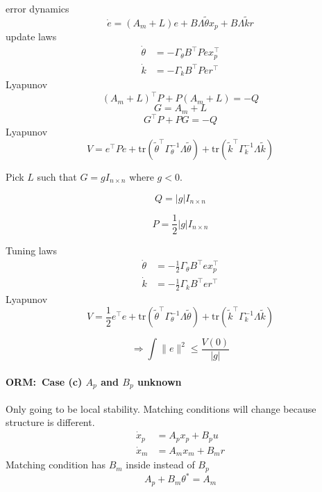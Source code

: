 error dynamics
\begin{equation*}
  \dot{e}=(A_{m}+L)e+B\Lambda\tilde{\theta}x_{p}+B\Lambda\tilde{k}r
\end{equation*}
update laws
\begin{align*}
  \dot{\theta}&=-\Gamma_{\theta}B^{\top}Pex_{p}^{\top} \\
  \dot{k}&=-\Gamma_{k}B^{\top}Per^{\top}
\end{align*}
Lyapunov
\begin{equation*}
  (A_{m}+L)^{\top}P+P(A_{m}+L)=-Q
\end{equation*}
\begin{equation*}
  G=A_{m}+L
\end{equation*}
\begin{equation*}
  G^{\top}P+PG=-Q
\end{equation*}
Lyapunov
\begin{equation*}
  V=e^{\top}Pe
  +\text{tr}\left(\tilde{\theta}^{\top}\Gamma_{\theta}^{-1}\Lambda\tilde{\theta}\right)
  +\text{tr}\left(\tilde{k}^{\top}\Gamma_{k}^{-1}\Lambda\tilde{k}\right)
\end{equation*}

Pick $L$ such that $G=gI_{n\times n}$ where $g<0$.

\begin{equation*}
  Q=|g|I_{n\times n}
\end{equation*}

\begin{equation*}
  P=\frac{1}{2}|g|I_{n\times n}
\end{equation*}

Tuning laws
\begin{align*}
  \dot{\theta}&=-\frac{1}{2}\Gamma_{\theta}B^{\top}ex_{p}^{\top} \\
  \dot{k}&=-\frac{1}{2}\Gamma_{k}B^{\top}er^{\top}
\end{align*}
Lyapunov
\begin{equation*}
  V=\frac{1}{2}e^{\top}e
  +\text{tr}\left(\tilde{\theta}^{\top}\Gamma_{\theta}^{-1}\Lambda\tilde{\theta}\right)
  +\text{tr}\left(\tilde{k}^{\top}\Gamma_{k}^{-1}\Lambda\tilde{k}\right)
\end{equation*}

\begin{equation*}
  \Rightarrow\int\|e\|^{2}\leq\frac{V(0)}{|g|}
\end{equation*}

\paragraph*{ORM:\ Case (c) $A_{p}$ and $B_{p}$ unknown}
Only going to be local stability.
Matching conditions will change because structure is different.
\begin{align*}
  \dot{x}_{p}&=A_{p}x_{p}+B_{p}u \\
  \dot{x}_{m}&=A_{m}x_{m}+B_{m}r
\end{align*}
Matching condition has $B_{m}$ inside instead of $B_{p}$
\begin{equation*}
  A_{p}+B_{m}\theta^{*}=A_{m}
\end{equation*}

